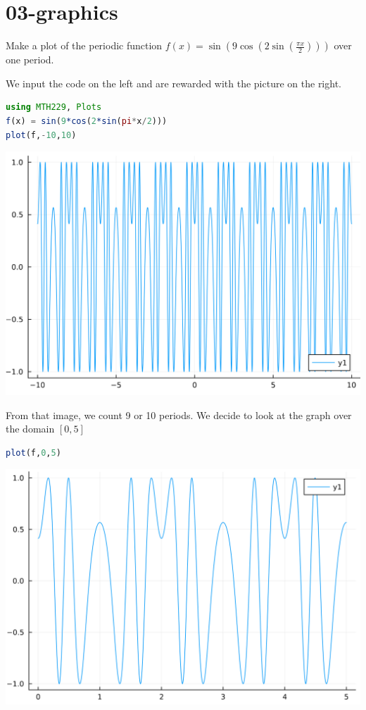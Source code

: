 \documentclass[12pt,answers]{book}
\begin{document}
\chapter{03-graphics}

Make a plot of the periodic function $\displaystyle f(x)=\sin(9\cos(2\sin(\frac{\pi x}{2})))$ over one period.

\vspace{5mm}
We input the code on the left and are rewarded with the picture on the right.\newline
\begin{minipage}[b]{0.49\textwidth}
\begin{lstlisting}[language=Julia]
using MTH229, Plots
f(x) = sin(9*cos(2*sin(pi*x/2)))
plot(f,-10,10)
\end{lstlisting}
\end{minipage}
\begin{minipage}{0.49\textwidth}
  \includegraphics[width=0.7\linewidth]{SkeletonNotes/03-graphics-1}
\end{minipage}\newline
From that image, we count 9 or 10 periods. We decide to look at the graph over the domain $[0,5]$
\begin{minipage}[b]{0.49\textwidth}
  \begin{lstlisting}[language=Julia]
plot(f,0,5)
  \end{lstlisting}
\end{minipage}
\begin{minipage}{0.49\textwidth}
  \includegraphics[width=0.7\linewidth]{SkeletonNotes/03-graphics-2}
\end{minipage}\newline
\end{document}
